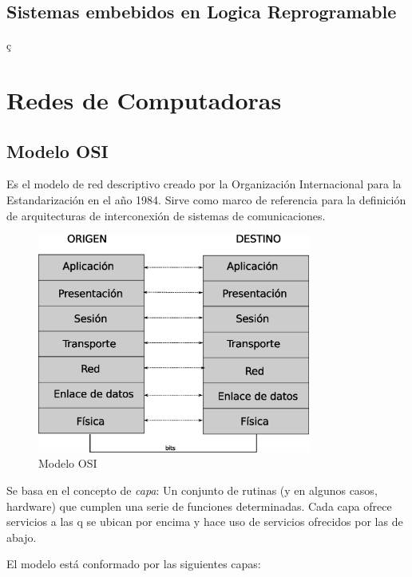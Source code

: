 \subsection{Sistemas embebidos en Logica Reprogramable}

ç



\section{Redes de Computadoras}

\subsection{Modelo OSI}

Es el modelo de red descriptivo creado por la Organización Internacional para la Estandarización en el año 1984. Sirve como marco de referencia para la definición de arquitecturas de interconexión de sistemas de comunicaciones.

\begin{figure}[h]
  \centering
	\includegraphics[width=0.80\textwidth]{2-sistema/graf/osi.eps}
  \caption{Modelo OSI}
  \label{fig:osi}
\end{figure}

Se basa en el concepto de \textit{capa}: Un conjunto de rutinas (y en algunos casos, hardware) que cumplen una serie de funciones determinadas. Cada capa ofrece servicios a las q se ubican por encima y hace uso de servicios ofrecidos por las de abajo. 



El modelo está conformado por las siguientes capas:

